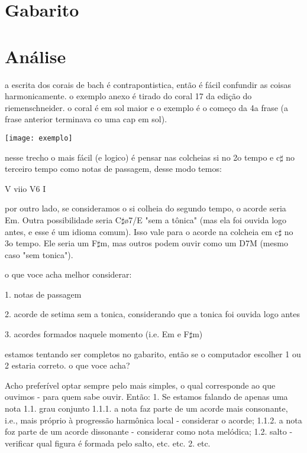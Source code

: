 \documentclass[12pt,brazil]{book}
\begin{document}
\section{Gabarito}
\label{sec:gabarito}

\section{Análise}
\label{sec:analise}

a escrita dos corais de bach é contrapontistica, então é fácil confundir
as coisas harmonicamente. o exemplo anexo é tirado do coral 17 da edição
do riemenschneider. o coral é em sol maior e o exemplo é o começo da 4a
frase (a frase anterior terminava co uma cap em sol).

\texttt{[image: exemplo]}

nesse trecho o mais fácil (e logico) é pensar nas colcheias si no 2o
tempo e c$\sharp$ no terceiro tempo como notas de passagem, desse modo temos:

V viio V6 I

por outro lado, se consideramos o si colheia do segundo tempo, o
acorde seria Em. Outra possibilidade seria C$\sharp$ø7/E "sem a
tônica" (mas ela foi ouvida logo antes, e esse é um idioma comum).
Isso vale para o acorde na colcheia em c$\sharp$ no 3o tempo. Ele
seria um F$\sharp$m, mas outros podem ouvir como um D7M (mesmo caso
"sem tonica").

o que voce acha melhor considerar:

1. notas de passagem

2. acorde de setima sem a tonica, considerando que a tonica foi ouvida
   logo antes

3. acordes formados naquele momento (i.e. Em e F$\sharp$m)

estamos tentando ser completos no gabarito, então se o computador
escolher 1 ou 2 estaria correto. o que voce acha?

Acho preferível optar sempre pelo mais simples, o qual corresponde ao que ouvimos - para quem sabe   
ouvir.  Então:                                                                                      
        1. Se estamos falando de apenas uma nota                                                     
                1.1. grau conjunto                                                                   
                        1.1.1. a nota faz parte de um acorde mais consonante, i.e., mais próprio à   
progressão harmônica local - considerar o acorde;                                                   
                        1.1.2. a nota foz parte de um acorde dissonante - considerar como nota       
melódica;                                                                                           
                1.2. salto - verificar qual figura é formada pelo salto, etc. etc.                   
        2. etc.                                                                                      
                                                                                                     
\end{document}
